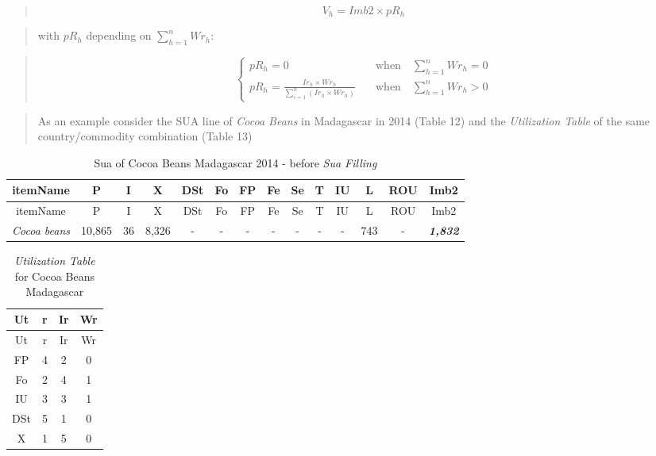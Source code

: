 \documentclass[]{article}
\begin{document}
\begin{quote}
\begin{equation}
\label{eq:inverseRank}
V_{h} = Imb2 \times pR_{h}
\end{equation}
\end{quote}

\begin{quote}
with \(pR_{h}\) depending on \(\sum \limits_{h=1}^n Wr_{h}\):
\end{quote}

\begin{quote}
\begin{equation}
\label{eq:weightRank}
\begin{cases}
pR_{h} = 0     & \quad \text{when} \quad \sum \limits_{h=1}^n Wr_{h} = 0\\
pR_{h} = \frac{Ir_{h}\times Wr_{h}}{\sum \limits_{i=1}^n\left(Ir_{h}\times Wr_{h}\right)}     & \quad \text{when} \quad \sum \limits_{h=1}^n Wr_{h} > 0 
\end{cases}
\end{equation}
\end{quote}

\begin{quote}
\end{quote}

\begin{quote}
As an example consider the SUA line of \emph{Cocoa Beans} in Madagascar
in 2014 (Table 12) and the \emph{Utilization Table} of the same
country/commodity combination (Table 13)
\end{quote}

\begin{longtable}[]{@{}cccccccccccccc@{}}
\caption{Sua of Cocoa Beans Madagascar 2014 - before \emph{Sua
Filling}}\tabularnewline
\toprule
itemName & P & I & X & DSt & Fo & FP & Fe & Se & T & IU & L & ROU &
Imb2\tabularnewline
\midrule
\endfirsthead
\toprule
itemName & P & I & X & DSt & Fo & FP & Fe & Se & T & IU & L & ROU &
Imb2\tabularnewline
\midrule
\endhead
\emph{Cocoa beans} & 10,865 & 36 & 8,326 & - & - & - & - & - & - & - &
743 & - & \textbf{\emph{1,832}}\tabularnewline
\bottomrule
\end{longtable}

\begin{longtable}[]{@{}cccc@{}}
\caption{\emph{Utilization Table} for Cocoa Beans
Madagascar}\tabularnewline
\toprule
Ut & r & Ir & Wr\tabularnewline
\midrule
\endfirsthead
\toprule
Ut & r & Ir & Wr\tabularnewline
\midrule
\endhead
FP & 4 & 2 & 0\tabularnewline
Fo & 2 & 4 & 1\tabularnewline
IU & 3 & 3 & 1\tabularnewline
DSt & 5 & 1 & 0\tabularnewline
X & 1 & 5 & 0\tabularnewline
\bottomrule
\end{longtable}
\end{document}
